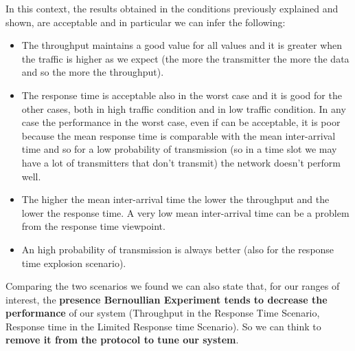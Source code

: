 \noindent In this context, the results obtained in the conditions previously explained and shown, are acceptable and in particular we can infer the following:
\begin{itemize}
	\item The throughput maintains a good value for all values and it is greater when the traffic is higher as we expect (the more the transmitter the more the data and so the more the throughput).
	
	\item The response time is acceptable also in the worst case and it is good for the other cases, both in high traffic condition and in low traffic condition. In any case the performance in the worst case, even if can be acceptable, it is poor because the mean response time is comparable with the mean inter-arrival time and so for a low probability of transmission (so in a time slot we may have a lot of transmitters that don't transmit) the network doesn't perform well.
	\item The higher the mean inter-arrival time the lower the throughput and the lower the response time. A very low mean inter-arrival time can be a problem from the response time viewpoint.
	\item An high probability of transmission is always better (also for the response time explosion scenario).
\end{itemize}

\noindent Comparing the two scenarios we found we can also state that, for our ranges of interest, the \textbf{presence Bernoullian Experiment tends to decrease the performance} of our system (Throughput in the Response Time Scenario, Response time in the Limited Response time Scenario). So we can think to \textbf{remove it from the protocol to tune our system}.